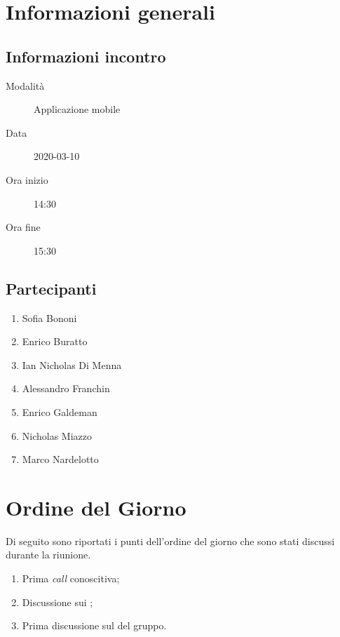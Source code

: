 \documentclass{article}
\begin{document}


\section{Informazioni generali}%
\label{sec:informazioni_generali}

\subsection{Informazioni incontro}%
\label{sub:informazioni_incontro}

\begin{description}
  \item[Modalità] Applicazione mobile 
  \item[Data] 2020-03-10
  \item[Ora inizio] 14:30
  \item[Ora fine] 15:30
\end{description}

\subsection{Partecipanti}%
\label{sub:partecipanti}

\begin{enumerate}
  \item Sofia Bononi
  \item Enrico Buratto
  \item Ian Nicholas Di Menna
  \item Alessandro Franchin
  \item Enrico Galdeman
  \item Nicholas Miazzo
  \item Marco Nardelotto
\end{enumerate}

\section{Ordine del Giorno}%
\label{ordine_del_giorno}
Di seguito sono riportati i punti dell'ordine del giorno che sono stati discussi durante la riunione.
\begin{enumerate}
  \item Prima \textit{call} conoscitiva;
  \item Discussione sui ;
  \item Prima discussione sul  del gruppo.
\end{enumerate}
\end{document}
